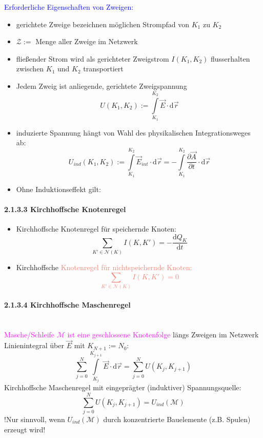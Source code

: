 \documentclass[]{article}
\newcommand{\dd}{\ensuremath{\text{d}}}
\begin{document}
\newpage

	\textcolor{Blue}{Erforderliche Eigenschaften von Zweigen:}

	\begin{boxedminipage}[Blue]{\textwidth}
	\begin{itemize}[itemsep=0pt,parsep=0pt]
		\item 
			gerichtete Zweige bezeichnen möglichen Strompfad von $K_1$ zu $K_2$
		\item 
			$\mathcal Z:=$ Menge aller Zweige im Netzwerk 
		\item 
			fließender Strom wird als gerichteter Zweigstrom $I(K_1,K_2)$ flusserhalten zwischen $K_1$ und $K_2$ transportiert
		\item 
			Jedem Zweig ist anliegende, gerichtete Zweigspannung $$U(K_1,K_2):=\int\limits_{K_1}^{K_2}\vec{E}\cdot \dd \vec{r}$$
		\item 
			induzierte Spannung hängt von Wahl des physikalischen Integrationsweges ab: 
			$$U_{ind}(K_1,K_2):=\int\limits_{K_1}^{K_2}\vec{E}_{int}\cdot \dd \vec{r}= -\int\limits_{K_1}^{K_2}\frac{∂\vec{A}}{∂t}\cdot \dd \vec{r}$$
		\item 
			Ohne Induktionseffekt gilt: 
	\end{itemize}
	\end{boxedminipage}
	
\newpage

\paragraph{2.1.3.3 Kirchhoffsche Knotenregel}

	\begin{itemize}
		\item 
			Kirchhoffsche Knotenregel für speichernde Knoten:
			$$\sum\limits_{K'\in \mathcal N(K)} I(K,K')=-\frac{\dd Q_K}{\dd t}$$
		\item 
			Kirchhoffsche \textcolor{Salmon}{Knotenregel für nichtspeichernde Knoten:
			$$\sum\limits_{K'\in \mathcal N(K)} I(K,K')=0$$}

	\end{itemize}

\paragraph{2.1.3.4 Kirchhoffsche Maschenregel}
	\ \\\textcolor{magenta}{Masche/Schleife $\mathcal M$ ist eine geschlossene Knotenfolge} längs Zweigen im Netzwerk
	Linienintegral über $\vec{E}$ mit $K_{N+1}:=N_0$: 
	$$\sum\limits_{j=0}^{N}\int\limits_{K_j}^{K_{j+1}}\vec{E}\cdot \dd \vec{r}= \sum\limits_{j=0}^{N}U(K_j,K_{j+1})$$
	Kirchhoffsche Maschenregel mit eingeprägter (induktiver) Spannungsquelle: 
	$$\sum\limits_{j=0}^{N}U(K_j,K_{j+1})=U_{ind}(\mathcal M)$$
	!Nur sinnvoll, wenn $U_{ind}(\mathcal M)$ durch konzentrierte Bauelemente (z.B. Spulen) erzeugt wird!
\end{document}
